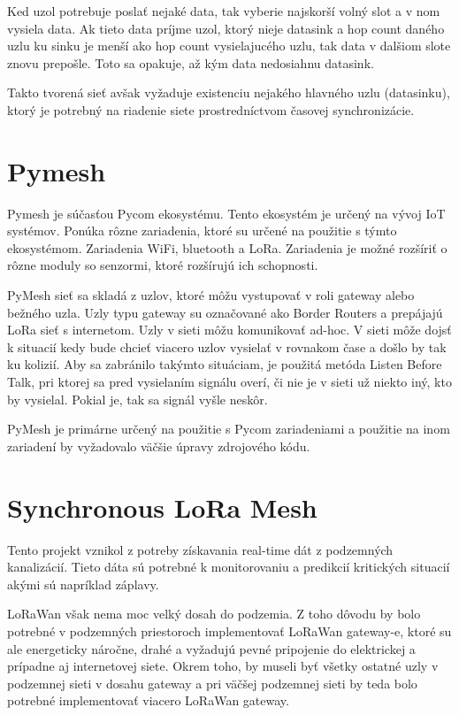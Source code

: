 \documentclass[slovak,master]{diploma}
\begin{document}
Ked uzol potrebuje poslať nejaké data, tak vyberie najskorší volný slot a v nom vysiela data. Ak tieto data príjme uzol, ktorý nieje datasink a 
hop count daného uzlu ku sinku je menší ako hop count vysielajucého uzlu, tak data v dalšiom slote znovu prepošle. Toto sa opakuje, až 
kým data nedosiahnu datasink.

Takto tvorená sieť avšak vyžaduje existenciu nejakého hlavného uzlu (datasinku), ktorý je potrebný na riadenie siete prostredníctvom časovej synchronizácie.

\section{Pymesh}
Pymesh je súčasťou Pycom \cite{pycom} ekosystému. Tento ekosystém je určený na vývoj IoT systémov. Ponúka rôzne zariadenia, ktoré su určené na použitie s týmto 
ekosystémom. Zariadenia WiFi, bluetooth a LoRa. Zariadenia je možné rozšíriť o rôzne moduly so senzormi, ktoré rozšírujú ich schopnosti. %

PyMesh sieť sa skladá z uzlov, ktoré môžu vystupovať v roli gateway alebo bežného uzla. Uzly typu gateway su označované ako Border Routers a prepájajú LoRa sieť s 
internetom. Uzly v sieti môžu komunikovať ad-hoc. V sieti môže dojsť k situacií kedy bude chcieť viacero uzlov vysielať v rovnakom čase a došlo by tak ku kolizií.
Aby sa zabránilo takýmto situáciam, je použitá metóda Listen Before Talk, pri ktorej sa pred vysielaním signálu overí, či nie je v sieti už niekto iný, kto by 
vysielal. Pokial je, tak sa signál vyšle neskôr.

PyMesh je primárne určený na použitie s Pycom zariadeniami a použitie na inom zariadení by vyžadovalo väčšie úpravy zdrojového kódu.

\section{Synchronous LoRa Mesh}
Tento projekt\cite{synchronouslorameshnetwork} vznikol z potreby získavania real-time dát z podzemných kanalizácií. Tieto dáta sú potrebné k monitorovaniu a predikcií kritických situacií akými 
sú napríklad záplavy.

LoRaWan však nema moc velký dosah do podzemia. Z toho dôvodu by bolo potrebné v podzemných priestoroch implementovať LoRaWan gateway-e, ktoré su ale energeticky náročne, drahé a vyžadujú 
pevné pripojenie do elektrickej a prípadne aj internetovej siete. Okrem toho, by museli byť všetky ostatné uzly v podzemnej sieti v dosahu gateway a pri väčšej podzemnej sieti 
by teda bolo potrebné implementovať viacero LoRaWan gateway.
\end{document}
